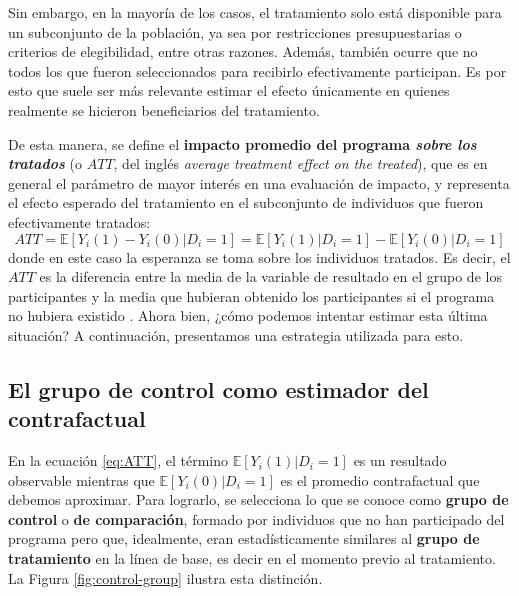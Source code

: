 \documentclass[../../main.tex]{subfiles}
\begin{document}
Sin embargo, en la mayoría de los casos, el tratamiento solo está disponible para un
subconjunto de la población, ya sea por restricciones presupuestarias o criterios de
elegibilidad, entre otras razones. Además, también ocurre que no todos los que fueron
seleccionados para recibirlo efectivamente participan. Es por esto que suele ser más
relevante estimar el efecto únicamente en quienes realmente se hicieron beneficiarios del
tratamiento.

De esta manera, se define el \textbf{impacto promedio del programa \textit{sobre los
tratados}} (o \(ATT\), del inglés \textit{average treatment effect on the treated}), que
es en general el parámetro de mayor interés en una evaluación de impacto, y representa el
efecto esperado del tratamiento en el subconjunto de individuos que fueron efectivamente
tratados:
\begin{equation}
    ATT = \mathbb{E} \left[Y_i(1)-Y_i(0)|D_i=1\right] = \mathbb{E} \left[Y_i(1)|D_i=1\right] -
    \mathbb{E} \left[Y_i(0)|D_i=1\right]
    \label{eq:ATT}
\end{equation}
donde en este caso la esperanza se toma sobre los individuos tratados. Es decir, el
\(ATT\) es la diferencia entre la media de la variable de resultado en el grupo de los
participantes y la media que hubieran obtenido los participantes si el programa no hubiera
existido \cite{bernal}. Ahora bien, ¿cómo podemos intentar estimar esta última situación?
A continuación, presentamos una estrategia utilizada para esto.

\subsection{El grupo de control como estimador del contrafactual}
En la ecuación \ref{eq:ATT}, el término \(\mathbb{E} \left[Y_i(1)|D_i=1\right]\) es un
resultado observable mientras que \(\mathbb{E} \left[Y_i(0)|D_i=1\right]\) es el promedio
contrafactual que debemos aproximar. Para lograrlo, se selecciona lo que se conoce como
\textbf{grupo de control} o \textbf{de comparación}, formado por individuos que no han
participado del programa pero que, idealmente, eran estadísticamente similares
\cite{gertler-2016} al \textbf{grupo de tratamiento} en la línea de base, es decir en el
momento previo al tratamiento. La Figura \ref{fig:control-group} ilustra esta distinción.
\end{document}
